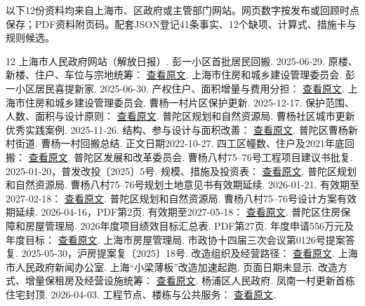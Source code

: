 \documentclass[UTF8,11pt,fontset=windows]{ctexart}
\begin{document}
以下12份资料均来自上海市、区政府或主管部门网站。网页数字按发布或回顾时点保存；PDF资料附页码。配套JSON登记41条事实、12个缺项、计算式、措施卡与规则候选。

\begin{thebibliography}{12}
 上海市人民政府网站（解放日报）. 彭一小区首批居民回搬. 2025-06-29. 原楼、新楼、住户、车位与宗地统筹：
\href{https://www.shanghai.gov.cn/nw4411/20250629/122d68440df64622856c021d406fbbc7.html?siteId=1}{查看原文}.
 上海市住房和城乡建设管理委员会. 彭一小区居民喜提新家. 2025-06-30. 产权住户、面积增量与费用分担：
\href{https://zjw.sh.gov.cn/gqdt/20250630/5851d22372be48108cd6e72ee46b4dbd.html}{查看原文}.
 上海市住房和城乡建设管理委员会. 曹杨一村片区保护更新. 2025-12-17. 保护范围、人数、面积与设计原则：
\href{https://zjw.sh.gov.cn/gqdt/20251217/cb50bb7da9164cd8a69ed06dd5a5c379.html}{查看原文}.
 普陀区规划和自然资源局. 曹杨社区城市更新优秀实践案例. 2025-11-26. 结构、参与设计与面积改善：
\href{https://www.shpt.gov.cn/gtj-zfbm/tpxinwen-gtj/20251126/965414.html}{查看原文}.
 普陀区曹杨新村街道. 曹杨一村回搬总结. 正文日期2022-10-27. 四工区幢数、住户及2021年底回搬：
\href{https://www.shpt.gov.cn/cyjd-jiedaozhen/alcy-cyjd/20220218/834027.html}{查看原文}.
 普陀区发展和改革委员会. 曹杨八村75--76号工程项目建议书批复. 2025-01-20，普发改投〔2025〕5号. 规模、措施及投资表：
\href{https://www.shpt.gov.cn/zhengwu/xmjyssp-fgwzdgz/2025/42/194395.html}{查看原文}.
 普陀区规划和自然资源局. 曹杨八村75--76号规划土地意见书有效期延续. 2026-01-21. 有效期至2027-02-18：
\href{https://www.shpt.gov.cn/zhengwu/yslztz-ghzyjzdgz/2026/23/201338.html}{查看原文}.
 普陀区规划和自然资源局. 曹杨八村75--76号设计方案有效期延续. 2026-04-16，PDF第2页. 有效期至2027-05-18：
\href{https://www.shpt.gov.cn/zhengwu/jsgcsjfascyj-ghzyjzdgz/2026/107/203278/18e7d017497049799af82794390c8f39.pdf}{查看原文}.
 普陀区住房保障和房屋管理局. 2026年度项目绩效目标汇总表. PDF第27页. 年度申请556万元及年度目标：
\href{https://www.shpt.gov.cn/zhengwu/jxpj-czzj/2026/37/201586/fc5eaffcdf4148fdbd4cdd7d931c056b.pdf}{查看原文}.
 上海市房屋管理局. 市政协十四届三次会议第0126号提案答复. 2025-05-30，沪房提案复〔2025〕18号. 改造组织及经营路径：
\href{https://www.shanghai.gov.cn/gwk/search/content/1c9b99697c324050b5d4f47bfc637f73}{查看原文}.
 上海市人民政府新闻办公室. 上海“小梁薄板”改造加速起跑. 页面日期未显示. 改造方式、增量保租房及经营设施统筹：
\href{https://en.shio.gov.cn/TrueCMS/shxwbgs/ywts/content/c235c900-c155-4ff6-a785-9714debc8642.htm}{查看原文}.
 杨浦区人民政府. 凤南一村更新首栋住宅封顶. 2026-04-03. 工程节点、楼栋与公共服务：
\href{https://www.shyp.gov.cn/shypq/xwzx-jzdt/20260403/502950.html}{查看原文}.
\end{thebibliography}
\end{document}
